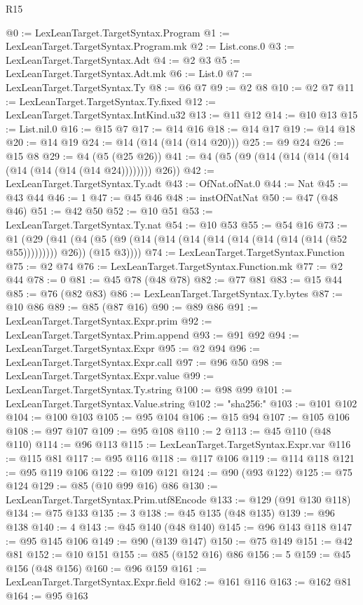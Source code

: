 \begin{lexlean}{R15}
\begin{coremodule}
{{{{{{{{{{{{{{{{{{{{{{{{{{{{{{{{{{{{{{{{{{{{{{{{{{{{{{{{{{{{{{{{{{{{{{@0 := LexLeanTarget.TargetSyntax.Program
@1 := LexLeanTarget.TargetSyntax.Program.mk
@2 := List.cons.{0}
@3 := LexLeanTarget.TargetSyntax.Adt
@4 := @2 @3
@5 := LexLeanTarget.TargetSyntax.Adt.mk
@6 := List.{0}
@7 := LexLeanTarget.TargetSyntax.Ty
@8 := @6 @7
@9 := @2 @8
@10 := @2 @7
@11 := LexLeanTarget.TargetSyntax.Ty.fixed
@12 := LexLeanTarget.TargetSyntax.IntKind.u32
@13 := @11 @12
@14 := @10 @13
@15 := List.nil.{0}
@16 := @15 @7
@17 := @14 @16
@18 := @14 @17
@19 := @14 @18
@20 := @14 @19
@24 := @14 (@14 (@14 (@14 @20)))
@25 := @9 @24
@26 := @15 @8
@29 := @4 (@5 (@25 @26))
@41 := @4 (@5 (@9 (@14 (@14 (@14 (@14 (@14 (@14 (@14 (@14 @24)))))))) @26))
@42 := LexLeanTarget.TargetSyntax.Ty.adt
@43 := OfNat.ofNat.{0}
@44 := Nat
@45 := @43 @44
@46 := 1
@47 := @45 @46
@48 := instOfNatNat
@50 := @47 (@48 @46)
@51 := @42 @50
@52 := @10 @51
@53 := LexLeanTarget.TargetSyntax.Ty.nat
@54 := @10 @53
@55 := @54 @16
@73 := @1
    (@29
      (@41 (@4 (@5 (@9 (@14 (@14 (@14 (@14 (@14 (@14 (@14 (@14 (@52 @55))))))))) @26)) (@15 @3))))
@74 := LexLeanTarget.TargetSyntax.Function
@75 := @2 @74
@76 := LexLeanTarget.TargetSyntax.Function.mk
@77 := @2 @44
@78 := 0
@81 := @45 @78 (@48 @78)
@82 := @77 @81
@83 := @15 @44
@85 := @76 (@82 @83)
@86 := LexLeanTarget.TargetSyntax.Ty.bytes
@87 := @10 @86
@89 := @85 (@87 @16)
@90 := @89 @86
@91 := LexLeanTarget.TargetSyntax.Expr.prim
@92 := LexLeanTarget.TargetSyntax.Prim.append
@93 := @91 @92
@94 := LexLeanTarget.TargetSyntax.Expr
@95 := @2 @94
@96 := LexLeanTarget.TargetSyntax.Expr.call
@97 := @96 @50
@98 := LexLeanTarget.TargetSyntax.Expr.value
@99 := LexLeanTarget.TargetSyntax.Ty.string
@100 := @98 @99
@101 := LexLeanTarget.TargetSyntax.Value.string
@102 := "sha256:"
@103 := @101 @102
@104 := @100 @103
@105 := @95 @104
@106 := @15 @94
@107 := @105 @106
@108 := @97 @107
@109 := @95 @108
@110 := 2
@113 := @45 @110 (@48 @110)
@114 := @96 @113
@115 := LexLeanTarget.TargetSyntax.Expr.var
@116 := @115 @81
@117 := @95 @116
@118 := @117 @106
@119 := @114 @118
@121 := @95 @119 @106
@122 := @109 @121
@124 := @90 (@93 @122)
@125 := @75 @124
@129 := @85 (@10 @99 @16) @86
@130 := LexLeanTarget.TargetSyntax.Prim.utf8Encode
@133 := @129 (@91 @130 @118)
@134 := @75 @133
@135 := 3
@138 := @45 @135 (@48 @135)
@139 := @96 @138
@140 := 4
@143 := @45 @140 (@48 @140)
@145 := @96 @143 @118
@147 := @95 @145 @106
@149 := @90 (@139 @147)
@150 := @75 @149
@151 := @42 @81
@152 := @10 @151
@155 := @85 (@152 @16) @86
@156 := 5
@159 := @45 @156 (@48 @156)
@160 := @96 @159
@161 := LexLeanTarget.TargetSyntax.Expr.field
@162 := @161 @116
@163 := @162 @81
@164 := @95 @163
}}}}}}}}}}}}}}}}}}}}}}}}}}}}}}}}}}}}}}}}}}}}}}}}}}}}}}}}}}}}}}}}}}}}}}
\end{coremodule}
\end{lexlean}
